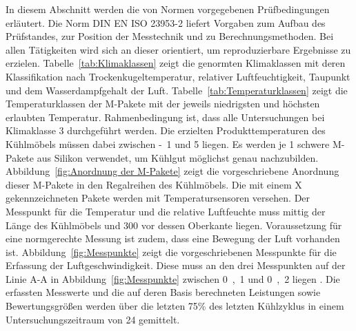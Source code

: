 In diesem Abschnitt werden die von Normen vorgegebenen Prüfbedingungen erläutert.
Die Norm DIN EN ISO 23953-2 liefert Vorgaben zum Aufbau des Prüfstandes, zur Position der Messtechnik und zu Berechnungsmethoden. Bei allen Tätigkeiten wird sich an dieser orientiert, um reproduzierbare Ergebnisse zu erzielen.
Tabelle~\ref{tab:Klimaklassen} zeigt die genormten Klimaklassen mit deren Klassifikation nach Trockenkugeltemperatur, relativer Luftfeuchtigkeit, Taupunkt und dem Wasserdampfgehalt der Luft. Tabelle~\ref{tab:Temperaturklassen} zeigt die Temperaturklassen der M-Pakete mit der jeweils niedrigsten und höchsten erlaubten Temperatur. Rahmenbedingung ist, dass alle Untersuchungen bei Klimaklasse 3 durchgeführt werden. Die erzielten Produkttemperaturen des Kühlmöbels müssen dabei zwischen \unit{-1}{\celsius} und \unit{5}{\celsius} liegen. \newline
Es werden je \unit{1}{\kilogram} schwere M-Pakete aus Silikon verwendet, um Kühlgut möglichst genau nachzubilden. Abbildung~\ref{fig:Anordnung der M-Pakete} zeigt die vorgeschriebene Anordnung dieser M-Pakete in den Regalreihen des Kühlmöbels. Die mit einem X gekennzeichneten Pakete werden mit Temperatursensoren versehen.
Der Messpunkt für die Temperatur und die relative Luftfeuchte muss mittig der Länge des Kühlmöbels und \unit{300}{\milli\metre} vor dessen Oberkante liegen. \newline
Voraussetzung für eine normgerechte Messung ist zudem, dass eine Bewegung der Luft vorhanden ist. Abbildung~\ref{fig:Messpunkte} zeigt die vorgeschriebenen Messpunkte für die Erfassung der Luftgeschwindigkeit. Diese muss an den drei Messpunkten auf der Linie A-A in Abbildung~\ref{fig:Messpunkte} zwischen \unit{0,1}{\meter\per\second} und \unit{0,2}{\meter\per\second} liegen \cite{DINDeutschesInstitutfurNormunge.V..}. \newline
Die erfassten Messwerte und die auf deren Basis berechneten Leistungen sowie Bewertungsgrößen werden über die letzten \unit{75}{\%} des letzten Kühlzyklus in einem Untersuchungszeitraum von \unit{24}{\hour} gemittelt.


\clearpage


